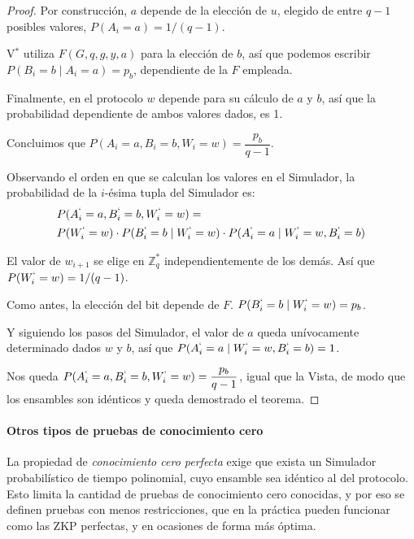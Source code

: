 \begin{proof}
	Por construcción, $a$ depende de la elección de $u$, elegido de entre $q-1$ posibles valores, $P(A_i = a) = 1/(q-1)$.
	
	V$^*$ utiliza $F(G,q,g,y,a)$ para la elección de $b$, así que podemos escribir $P(B_i = b \mid A_i = a) = p_b$, dependiente de la $F$ empleada.
	
	Finalmente, en el protocolo $w$ depende para su cálculo de $a$ y $b$, así que la probabilidad dependiente de ambos valores dados, es 1.
	
	Concluimos que $P(A_i=a, B_i=b, W_i = w) = \dfrac{p_b}{q-1}$.
	
	
	Observando el orden en que se calculan los valores en el Simulador, la probabilidad de la $i$-ésima tupla del Simulador es:
	\begin{align*}
	& P(A_i^`=a, B_i^`=b, W_i^` = w) = \\
	& P(W_i^` = w) \cdot P(B_i^` = b \mid W_i^` = w) \cdot P(A_i^` = a \mid W_i^` = w, B_i^`=b)
	\end{align*}
	
	El valor de $w_{i+1}$ se elige en $\mathbb{Z}_q^*$ independientemente de los demás. Así que $P(W_i^` = w) =  1/(q-1)$.
	
	Como antes, la elección del bit depende de $F$. $  P(B_i^` = b \mid W_i^` = w) = p_b $.
	
	Y siguiendo los pasos del Simulador, el valor de $a$ queda unívocamente determinado dados $w$ y $b$, así que $P(A_i^` = a \mid W_i^` = w, B_i^`=b) = 1$.
	
	Nos queda $ P(A_i^`=a, B_i^`=b, W_i^` = w) = \dfrac{p_b}{q-1}$, igual que la Vista, de modo que los ensambles son idénticos y queda demostrado el teorema.
	
\end{proof}


\hfil

\paragraph{Otros tipos de pruebas de conocimiento cero}

La propiedad de \textit{conocimiento cero perfecta} exige que exista un Simulador probabilístico de tiempo polinomial, cuyo ensamble sea idéntico al del protocolo. Esto limita la cantidad de pruebas de conocimiento cero conocidas, y por eso se definen pruebas con menos restricciones, que en la práctica pueden funcionar como las ZKP perfectas, y en ocasiones de forma más óptima.

